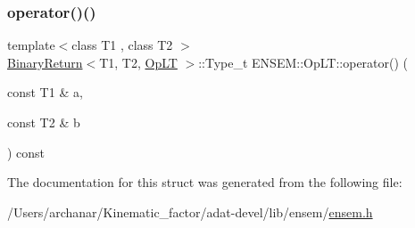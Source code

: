 \subsubsection{\texorpdfstring{operator()()}{operator()()}\hspace{0.1cm}{\footnotesize\ttfamily [3/3]}}
{\footnotesize\ttfamily template$<$class T1 , class T2 $>$ \\
\mbox{\hyperlink{structENSEM_1_1BinaryReturn}{Binary\+Return}}$<$T1, T2, \mbox{\hyperlink{structENSEM_1_1OpLT}{Op\+LT}} $>$\+::Type\+\_\+t E\+N\+S\+E\+M\+::\+Op\+L\+T\+::operator() (\begin{DoxyParamCaption}\item[{const T1 \&}]{a,  }\item[{const T2 \&}]{b }\end{DoxyParamCaption}) const\hspace{0.3cm}{\ttfamily [inline]}}



The documentation for this struct was generated from the following file\+:\begin{DoxyCompactItemize}
\item 
/\+Users/archanar/\+Kinematic\+\_\+factor/adat-\/devel/lib/ensem/\mbox{\hyperlink{adat-devel_2lib_2ensem_2ensem_8h}{ensem.\+h}}\end{DoxyCompactItemize}
